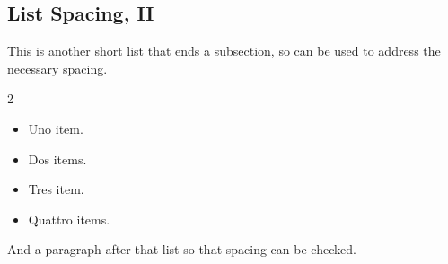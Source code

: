\documentclass[pdflatex]{sn-jnl}
\theoremstyle{thmstyleone}%
\theoremstyle{thmstyletwo}%
\theoremstyle{thmstylethree}%
\numberwithin{equation}{section}
\begin{document}
\subsection{List Spacing, II}\label{section-lists-4}%
This is another short list that ends a subsection, so can be used to address the necessary spacing.%
\begin{multicols}{2}
\begin{itemize}[label=\textbullet]
\item{}Uno item.%
\item{}Dos items.%
\item{}Tres item.%
\item{}Quattro items.%
\end{itemize}
\end{multicols}
%
\par
And a paragraph after that list so that spacing can be checked.%
%
%
\typeout{************************************************}
\typeout{************************************************}
%
\end{document}

